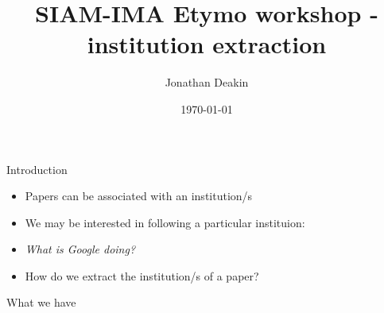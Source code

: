 \documentclass{beamer}
\begin{document}
\title{SIAM-IMA Etymo workshop - institution extraction}
\author{Jonathan Deakin}
\date{\today}

\begin{frame}
  \maketitle
\end{frame}

\begin{frame}{Introduction}
  \begin{overlayarea}{\textwidth}{\textheight}
    \begin{itemize}
      \item<1-> Papers can be associated with an institution/s
      \item<2-> We may be interested in following a particular instituion:
      \item<3->[]
      \begin{center}
        \emph{What is Google doing?}
      \end{center}
      \item<4-> How do we extract the institution/s of a paper?
    \end{itemize}


  \end{overlayarea}
\end{frame}


\begin{frame}{What we have}
\end{frame}
\end{document}
